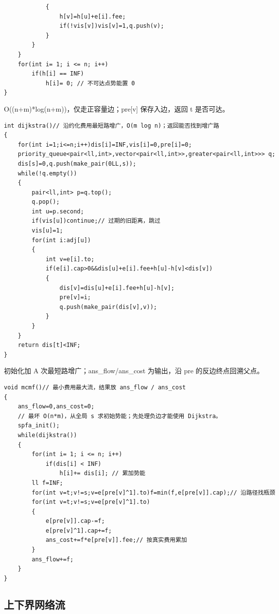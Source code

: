 \documentclass[UTF8,fontset=fandol,a4paper,twoside]{ctexart}
\newcommand{\note}[1]{{\fontsize{10}{12}\selectfont #1\par}}
\begin{document}
\begin{multicols}{2}
\begin{lstlisting}
            {
                h[v]=h[u]+e[i].fee;
                if(!vis[v])vis[v]=1,q.push(v);
            }
        }
    }
    for(int i= 1; i <= n; i++)
        if(h[i] == INF)
            h[i]= 0; // 不可达点势能置 0
}
\end{lstlisting}
\note{O(\allowbreak{}(\allowbreak{}n+\allowbreak{}m)\allowbreak{}*log(\allowbreak{}n+\allowbreak{}m)\allowbreak{})\allowbreak{}，仅走正容量边；pre[\allowbreak{}v]\allowbreak{} 保存入边，返回 t 是否可达。}
\begin{lstlisting}
int dijkstra()// 沿约化费用最短路增广，O(m log n)；返回能否找到增广路
{
    for(int i=1;i<=n;i++)dis[i]=INF,vis[i]=0,pre[i]=0;
    priority_queue<pair<ll,int>,vector<pair<ll,int>>,greater<pair<ll,int>>> q;
    dis[s]=0,q.push(make_pair(0LL,s));
    while(!q.empty())
    {
        pair<ll,int> p=q.top();
        q.pop();
        int u=p.second;
        if(vis[u])continue;// 过期的旧距离，跳过
        vis[u]=1;
        for(int i:adj[u])
        {
            int v=e[i].to;
            if(e[i].cap>0&&dis[u]+e[i].fee+h[u]-h[v]<dis[v])
            {
                dis[v]=dis[u]+e[i].fee+h[u]-h[v];
                pre[v]=i;
                q.push(make_pair(dis[v],v));
            }
        }
    }
    return dis[t]<INF;
}
\end{lstlisting}
\note{初始化加 A 次最短路增广；ans\_flow/\allowbreak{}ans\_cost 为输出，沿 pre 的反边终点回溯父点。}
\begin{lstlisting}
void mcmf()// 最小费用最大流，结果放 ans_flow / ans_cost
{
    ans_flow=0,ans_cost=0;
    // 最坏 O(n*m)，从全局 s 求初始势能；先处理负边才能使用 Dijkstra。
    spfa_init();
    while(dijkstra())
    {
        for(int i= 1; i <= n; i++)
            if(dis[i] < INF)
                h[i]+= dis[i]; // 累加势能
        ll f=INF;
        for(int v=t;v!=s;v=e[pre[v]^1].to)f=min(f,e[pre[v]].cap);// 沿路径找瓶颈
        for(int v=t;v!=s;v=e[pre[v]^1].to)
        {
            e[pre[v]].cap-=f;
            e[pre[v]^1].cap+=f;
            ans_cost+=f*e[pre[v]].fee;// 按真实费用累加
        }
        ans_flow+=f;
    }
}
\end{lstlisting}
\subsection{上下界网络流}


\end{multicols}
\end{document}
